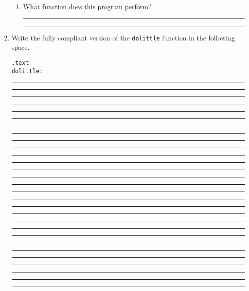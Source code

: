 \documentclass[a4paper,10pt]{article}
\begin{document}
\begin{enumerate}
\begin{enumerate}
\item What function does this program perform?
\vspace{3mm}\hrule\vspace{7mm}\hrule\vspace{3mm}

\end{enumerate}

\newpage
\item Write the fully compliant version of the \texttt{dolittle} function in the following space.
\vspace{5mm}
\begin{large}
\texttt{.text}\vspace{2mm}\\
\texttt{dolittle:}
\end{large}
\vspace{7mm}\hrule\vspace{7mm}\hrule\vspace{7mm}\hrule\vspace{7mm}\hrule
\vspace{7mm}\hrule\vspace{7mm}\hrule\vspace{7mm}\hrule\vspace{7mm}\hrule
\vspace{7mm}\hrule\vspace{7mm}\hrule\vspace{7mm}\hrule\vspace{7mm}\hrule
\vspace{7mm}\hrule\vspace{7mm}\hrule\vspace{7mm}\hrule\vspace{7mm}\hrule
\vspace{7mm}\hrule\vspace{7mm}\hrule\vspace{7mm}\hrule\vspace{7mm}\hrule
\vspace{7mm}\hrule\vspace{7mm}\hrule\vspace{7mm}\hrule\vspace{7mm}\hrule
\vspace{7mm}\hrule\vspace{7mm}\hrule\vspace{7mm}\hrule\vspace{7mm}\hrule
\vspace{7mm}\hrule
\vspace{3mm}
\begin{large}
\end{large}


\end{enumerate}
\end{document}
